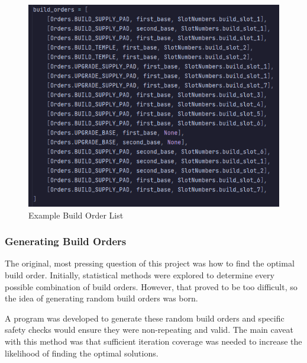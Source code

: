 \documentclass[a4paper, 12pt, english]{article}
\begin{document}
\begin{figure}[!ht]
    \begin{center}
        \includegraphics[width=125mm,scale=1.0]{BuildOrderListExample.png}
    \end{center}
    \caption{\label{fig:BuildOrderExample}Example Build Order List}
\end{figure}

\newpage
\subsubsection{Generating Build Orders}
The original, most pressing question of this project was how to find the optimal build order. Initially, statistical methods were explored to determine every possible combination of build orders. However, that proved to be too difficult, so the idea of generating random build orders was born. 
\newline

A program was developed to generate these random build orders and specific safety checks would ensure they were non-repeating and valid. The main caveat with this method was that sufficient iteration coverage was needed to increase the likelihood of finding the optimal solutions.
\newline
\end{document}
